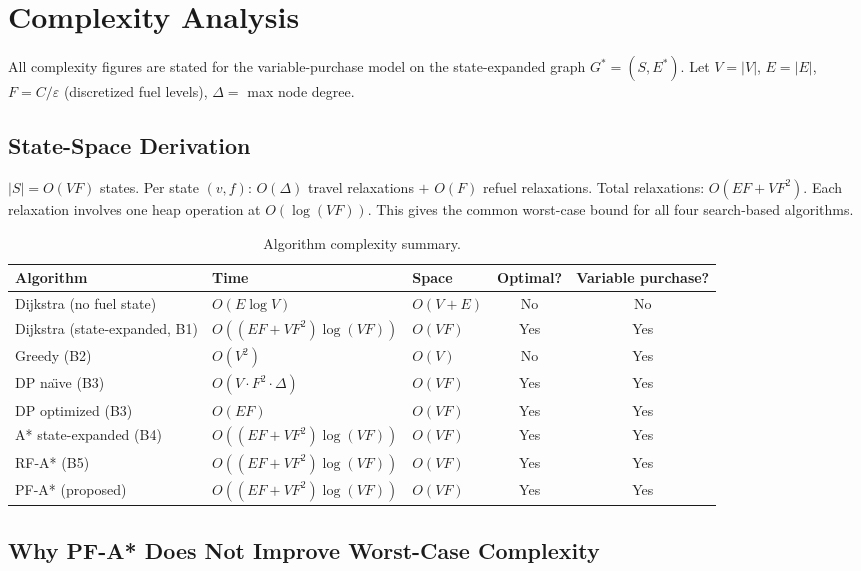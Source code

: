 \chapter{Complexity Analysis}
\label{ch:complexity}

All complexity figures are stated for the variable-purchase model on the state-expanded graph
$G^{*} = (S, E^{*})$.
Let $V = |V|$, $E = |E|$, $F = C/\varepsilon$ (discretized fuel levels),
$\Delta = $ max node degree.

\section{State-Space Derivation}

$|S| = O(VF)$ states.
Per state $(v,f)$: $O(\Delta)$ travel relaxations $+$ $O(F)$ refuel relaxations.
Total relaxations: $O(EF + VF^{2})$.
Each relaxation involves one heap operation at $O(\log(VF))$.
This gives the common worst-case bound for all four search-based algorithms.

\begin{table}[ht]
\centering
\caption{Algorithm complexity summary.}
\label{tab:complexity}
\small
\begin{tabular}{lllcc}
\toprule
Algorithm & Time & Space & Optimal? & Variable purchase? \\
\midrule
Dijkstra (no fuel state)       & $O(E\log V)$                   & $O(V{+}E)$ & No  & No \\
Dijkstra (state-expanded, B1)  & $O((EF{+}VF^{2})\log(VF))$    & $O(VF)$    & Yes & Yes \\
Greedy (B2)                    & $O(V^{2})$                      & $O(V)$     & No  & Yes \\
DP na\"{\i}ve (B3)             & $O(V{\cdot}F^{2}{\cdot}\Delta)$ & $O(VF)$    & Yes & Yes \\
DP optimized (B3)              & $O(EF)$                         & $O(VF)$    & Yes & Yes \\
A* state-expanded (B4)         & $O((EF{+}VF^{2})\log(VF))$    & $O(VF)$    & Yes & Yes \\
RF-A* (B5)                     & $O((EF{+}VF^{2})\log(VF))$    & $O(VF)$    & Yes & Yes \\
PF-A* (proposed)               & $O((EF{+}VF^{2})\log(VF))$    & $O(VF)$    & Yes & Yes \\
\bottomrule
\end{tabular}
\end{table}

\section{Why PF-A* Does Not Improve Worst-Case Complexity}

